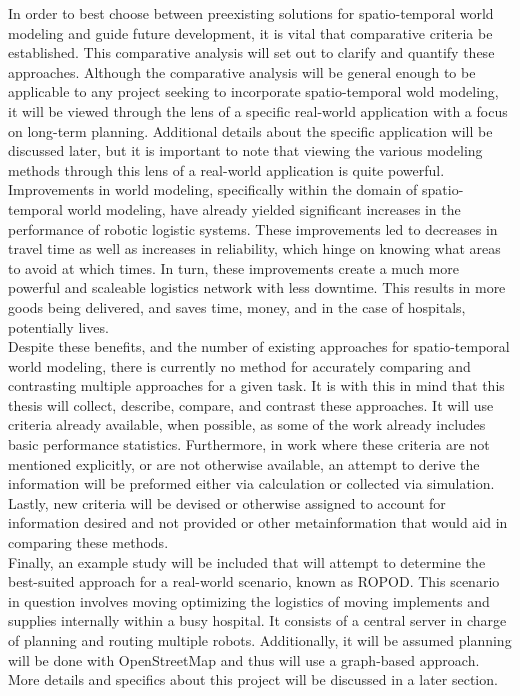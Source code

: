   In order to best choose between preexisting solutions for spatio-temporal
  world modeling and guide future development, it is vital that comparative criteria be
  established. This comparative analysis will set out to clarify and quantify
  these approaches. Although the comparative analysis will be general enough to be
  applicable to any project seeking to incorporate spatio-temporal wold modeling,
  it will be viewed through the lens of a specific real-world application
  with a focus on long-term planning. Additional details about the specific application
  will be discussed later, but it is important to note that viewing the
  various modeling methods through this lens of a real-world application is quite
  powerful. \\

  Improvements in world modeling, specifically within the domain of
  spatio-temporal world modeling, have already yielded significant increases
  in the performance of robotic logistic systems. These improvements led to
  decreases in travel time as well as increases in reliability, which hinge
  on knowing what areas to avoid at which times. In turn, these improvements
  create a much more powerful and scaleable logistics network with less
  downtime. This results in more goods being delivered, and saves
  time, money, and in the case of hospitals, potentially lives. \\

  Despite these benefits, and the number of existing approaches
  for spatio-temporal world modeling, there is currently no method for
  accurately comparing and contrasting multiple approaches for a given task. It is with this
  in mind that this thesis will collect, describe, compare, and contrast these
  approaches. It will use criteria already available, when possible, as some
  of the work already includes basic performance statistics.
  Furthermore, in work where these criteria are not mentioned explicitly, or are
  not otherwise available, an attempt to derive the information will be preformed either via
  calculation or collected via simulation. Lastly, new criteria will be devised
  or otherwise assigned to account for information desired and not provided
  or other metainformation that would aid in comparing these methods. \\

  Finally, an example study will be included that will attempt to determine the
  best-suited approach for a real-world scenario, known as ROPOD. This
  scenario in question involves moving optimizing the logistics of moving
  implements and supplies internally within a busy hospital.
  It consists of a central server in charge of planning and routing multiple
  robots. Additionally, it will be assumed planning will be done with
  OpenStreetMap and thus will use a graph-based approach. More details and
  specifics about this project will be discussed in a later section. \\


